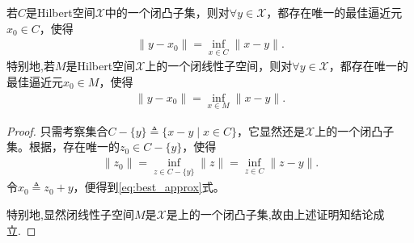 \documentclass[../../main.tex]{subfiles}%
\begin{document}
\begin{corollary}[最佳逼近元的存在唯一性]\label{corollary:泛函分析--最佳逼近元的存在唯一性}
若$C$是Hilbert空间$\mathscr{X}$中的一个闭凸子集，则对$\forall y \in \mathscr{X}$，都存在唯一的最佳逼近元$x_0 \in C$，使得
\begin{align}
\|y - x_0\| = \inf\limits_{x \in C} \|x - y\|. \label{eq:best_approx}
\end{align}
特别地,若$M$是Hilbert空间$\mathscr{X}$上的一个闭线性子空间，则对$\forall y \in \mathscr{X}$，都存在唯一的最佳逼近元$ x_0 \in M$，使得
\begin{align*}
\|y - x_0\| = \inf\limits_{x \in M} \|x - y\|.
\end{align*}
\end{corollary}
\begin{proof}

只需考察集合$C - \{y\} \triangleq \{x - y \mid x \in C\}$，它显然还是$\mathscr{X}$上的一个闭凸子集。根据，存在唯一的$ z_0 \in C - \{y\}$，使得
\begin{align*}
\parallel z_0\parallel =\mathop {\mathrm{inf}} \limits_{z\in C-\{y\}}\parallel z\parallel =\mathop {\mathrm{inf}} \limits_{z\in C}\parallel z-y\parallel .
\end{align*}
令$x_0 \triangleq z_0 + y$，便得到\eqref{eq:best_approx}式。

特别地,显然闭线性子空间$M$是$\mathscr{X}$是上的一个闭凸子集,故由上述证明知结论成立.
\end{proof}
\end{document}
